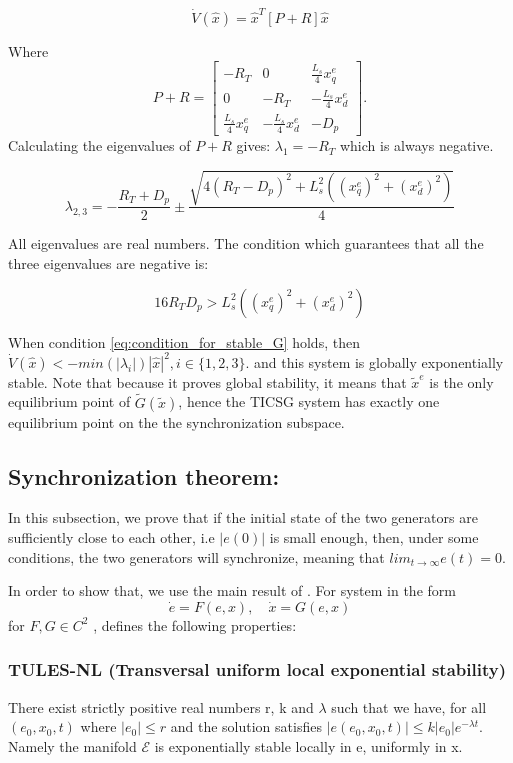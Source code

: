 \documentclass[letterpaper, 10 pt, conference]{ieeeconf}  %
\begin{document}
\[
\dot{V}(\hat{x})=\hat{x}^{T}\left[P+R\right]\hat{x}
\]

Where 
$$P+R=\left[\begin{array}{ccc}
-R_T & 0 & \frac{L_{s}}{4}x_{q}^{e}\\
0 & -R_T & -\frac{L_{s}}{4}x_{d}^{e}\\
\frac{L_{s}}{4}x_{q}^{e} & -\frac{L_{s}}{4}x_{d}^{e} & -D_{p}
\end{array}\right].$$
 Calculating the eigenvalues of $P+R$ gives:
 $\lambda_{1}=-R_T$
which is always negative. 

$$
\lambda_{2,3}=-\frac{R_T+D_{p}}{2} \pm\frac{\sqrt{4\left(R_T-D_{p}\right)^{2}+L_{s}^{2}\left(\left(x_{q}^{e}\right)^{2}+\left(x_{d}^{e}\right)^{2}\right)}}{4}
$$

All eigenvalues are real numbers. The condition which guarantees that all the three eigenvalues are negative is:

\begin{equation}
16 R_TD_{p}>L_{s}^{2}\left(\left(x_{q}^{e}\right)^{2}+\left(x_{d}^{e}\right)^{2}\right)\label{eq:condition_for_stable_G}
\end{equation}

When  condition \eqref{eq:condition_for_stable_G} holds, then $\dot{V}(\hat{x})<-min\left(\left|\lambda_{i}\right|\right)|\hat{x}|^{2},i\in\{1,2,3\}$.
and this system is globally exponentially stable. Note that because it proves global stability, it  means that $\tilde{x}^{e}$ is the only equilibrium point of $\tilde{G}(\tilde{x})$,
hence the TICSG system has exactly one equilibrium point on the the synchronization subspace.

\subsection{Synchronization theorem:}

In this subsection, we prove that if the initial state of the two generators
are sufficiently close to each other, i.e $|e(0)|$ is small enough, then, under some conditions, the two generators will synchronize, meaning that $lim_{t\to\infty}e(t)=0$.

In order to show that, we use the main result of \cite{AndrieuJayawardhanaPraly}. For system in the form 
$$ \dot{e} = F\left(e,x\right),\quad \dot{x} = G\left(e,x\right)$$ for   $F, G \in C^2$ , \cite{AndrieuJayawardhanaPraly} defines the following properties:

\subsubsection{TULES-NL (Transversal uniform local exponential stability)}
There exist strictly positive real numbers r, k and $\lambda$ such that we have, for all $\left(e_0, x_0, t\right)$  where $\left| e_0\right| \le r$ and the solution satisfies $\left|e\left(e_0, x_0, t\right)\right| \le k\left|e_0\right| e^{-\lambda t}$. Namely the manifold $\mathscr{E}$ is exponentially stable locally in e, uniformly in x.
\end{document}
